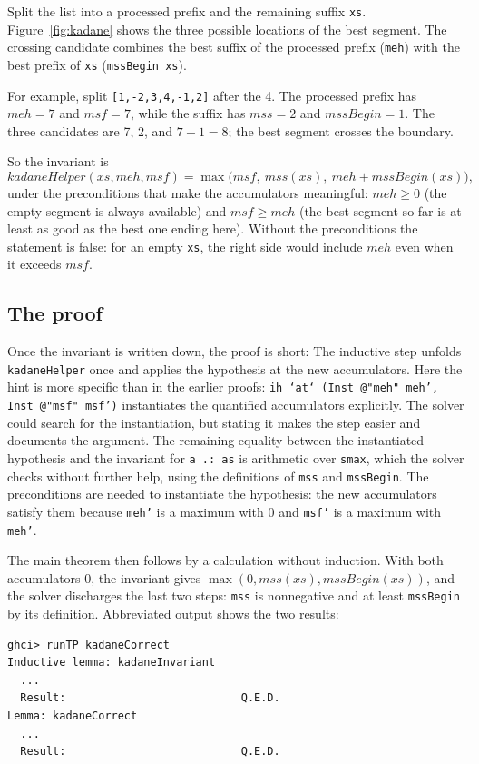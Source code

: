 \documentclass[acmsmall,screen,review,anonymous,nonacm]{acmart}
\newcommand{\code}[1]{\texttt{#1}}
\begin{document}
Split the list into a processed prefix and the remaining suffix \code{xs}.
Figure~\ref{fig:kadane} shows the three possible locations of the best segment.
The crossing candidate combines the best suffix of the processed prefix
(\code{meh}) with the best prefix of \code{xs} (\code{mssBegin xs}).

For example, split \code{[1,-2,3,4,-1,2]} after the 4. The processed prefix has
$\mathit{meh}=7$ and $\mathit{msf}=7$, while the suffix has
$\mathit{mss}=2$ and $\mathit{mssBegin}=1$. The three candidates are 7, 2, and
$7+1=8$; the best segment crosses the boundary.
\begin{samepage}
So the invariant is
\[
  \mathit{kadaneHelper}(xs, \mathit{meh}, \mathit{msf})
  = \max\bigl(\mathit{msf},\ \mathit{mss}(xs),\ \mathit{meh} + \mathit{mssBegin}(xs)\bigr),
\]
under the preconditions that make the accumulators meaningful:
$\mathit{meh} \geq 0$ (the empty segment is always available) and
$\mathit{msf} \geq \mathit{meh}$ (the best segment so far is at least as good as
the best one ending here). Without the preconditions the statement is false: for
an empty \code{xs}, the right side would include $\mathit{meh}$ even when it
exceeds $\mathit{msf}$.
\end{samepage}

\subsection{The proof}

Once the invariant is written down, the proof is short:
The inductive step unfolds \code{kadaneHelper} once and applies the hypothesis
at the new accumulators. Here the hint is more specific than in the earlier
proofs: \code{ih `at` (Inst @"meh" meh', Inst @"msf" msf')} instantiates the
quantified accumulators explicitly. The solver could search for the
instantiation, but stating it makes the step easier and documents the argument.
The remaining equality between the instantiated hypothesis and the invariant
for \code{a .: as} is arithmetic over \code{smax}, which the solver checks
without further help, using the definitions of \code{mss} and \code{mssBegin}.
The preconditions are needed to instantiate the hypothesis: the new accumulators
satisfy them because \code{meh'} is a maximum with 0 and \code{msf'} is a
maximum with \code{meh'}.

The main theorem then follows by a calculation without induction. With both
accumulators 0, the invariant gives
$\max(0, \mathit{mss}(xs), \mathit{mssBegin}(xs))$, and the solver discharges the
last two steps: \code{mss} is nonnegative and at least \code{mssBegin} by its
definition. Abbreviated output shows the two results:
\begin{lstlisting}[style=output]
ghci> runTP kadaneCorrect
Inductive lemma: kadaneInvariant
  ...
  Result:                           Q.E.D.
Lemma: kadaneCorrect
  ...
  Result:                           Q.E.D.
\end{lstlisting}
\end{document}
